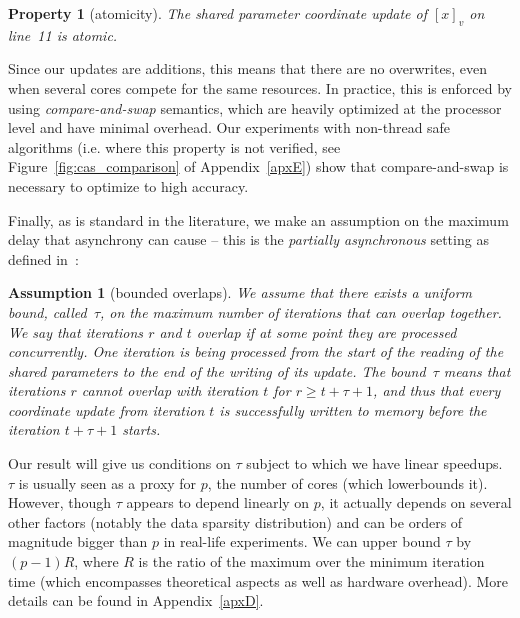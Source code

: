 \documentclass[twoside]{article}
\newcommand{\overlap}{\tau}
\newtheorem{asm}{Assumption}
\newtheorem{prop}{Property}
\begin{document}
\begin{prop} [atomicity]
The shared parameter coordinate update of $[x]_v$ on line~11 is atomic.
\label{eventconst}
\end{prop}
\vspace{-2mm}
Since our updates are additions, this means that there are no overwrites, even when several cores compete for the same resources. 
In practice, this is enforced by using \textit{compare-and-swap} semantics, which are heavily optimized at the processor level and have minimal overhead. 
Our experiments with non-thread safe algorithms (i.e. where this property is not verified, see Figure~\ref{fig:cas_comparison} of Appendix~\ref{apxE}) show that compare-and-swap is necessary to optimize to high accuracy.

Finally, as is standard in the literature, we make an assumption on the maximum delay that asynchrony can cause -- this is the \emph{partially asynchronous} setting as defined in~\citet{bertsekasParalle1989}:
\begin{asm}[bounded overlaps]\label{boundedoverlap}
We assume that there exists a uniform bound, called~$\overlap$, on the maximum number of iterations that can overlap together. We say that iterations $r$ and $t$ overlap if at some point they are processed concurrently. 
One iteration is being processed from the start of the reading of the shared parameters to the end of the writing of its update. 
The bound~$\overlap$ means that iterations $r$ cannot overlap with iteration $t$ for $r \geq t + \tau+1$,  and thus that every coordinate update from iteration $t$ is successfully written to memory before the iteration $t + \overlap+1$ starts.
\label{boundedoverlaps}
\end{asm}

\vspace{-2mm}
Our result will give us conditions on $\overlap$ subject to which we have linear speedups. 
$\overlap$ is usually seen as a proxy for $p$, the number of cores (which lowerbounds it). 
However, though $\overlap$ appears to depend linearly on $p$, it actually depends on several other factors (notably the data sparsity distribution) and can be orders of magnitude bigger than $p$ in real-life experiments.
We can upper bound $\overlap$ by $(p-1)R$, where $R$ is the ratio of the maximum over the minimum iteration time (which encompasses theoretical aspects as well as hardware overhead).
More details can be found in Appendix~\ref{apxD}.

\vspace{-2mm}
\end{document}
